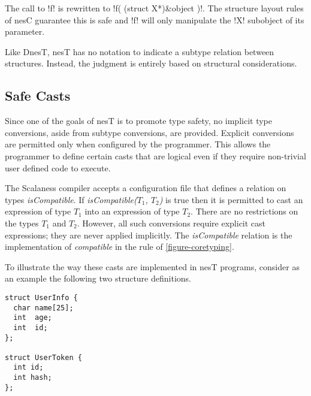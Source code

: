 
The call to !f! is rewritten to !f( (struct X*)&object )!. The structure layout rules of nesC
guarantee this is safe and !f! will only manipulate the !X! subobject of its parameter.


Like DnesT, nesT has no notation to indicate a subtype relation between structures. Instead, the
judgment is entirely based on structural considerations.

\subsection{Safe Casts}
\label{section-safe-casts}

Since one of the goals of nesT is to promote type safety, no implicit type conversions, aside
from subtype conversions, are provided. Explicit conversions are permitted only when configured
by the programmer. This allows the programmer to define certain casts that are logical even if
they require non-trivial user defined code to execute.

The Scalaness compiler accepts a configuration file that defines a relation on types
\textit{isCompatible}. If \textit{isCompatible($T_1$, $T_2$)} is true then it is permitted to
cast an expression of type $T_1$ into an expression of type $T_2$. There are no restrictions on
the types $T_1$ and $T_2$. However, all such conversions require explicit cast expressions; they
are never applied implicitly. The \textit{isCompatible} relation is the implementation of
\textit{compatible} in the  rule of \autoref{figure-coretyping}.

To illustrate the way these casts are implemented in nesT programs, consider as an example the
following two structure definitions.

\singlespace
\vspace{1.0ex}
\begin{lstlisting}[language=nesC]
struct UserInfo {
  char name[25];
  int  age;
  int  id;
};

struct UserToken {
  int id;
  int hash;
};
\end{lstlisting}
\vspace{1.0ex}
\primaryspacing

